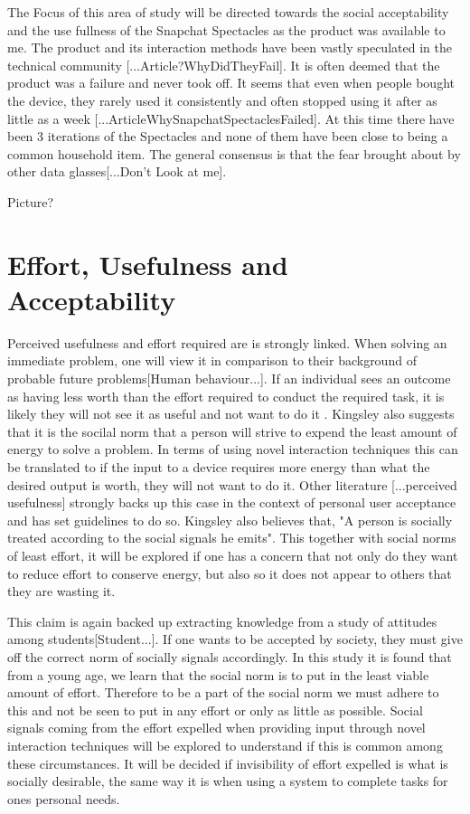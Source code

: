 \documentclass{l4proj}
\begin{document}
The Focus of this area of study will be directed towards the social acceptability and the use fullness of the Snapchat Spectacles as the product was available to me. The product and its interaction methods have been vastly speculated in the technical community [...Article?WhyDidTheyFail]. It is often deemed that the product was a failure and never took off. It seems that even when people bought the device, they rarely used it consistently and often stopped using it after as little as a week [...ArticleWhySnapchatSpectaclesFailed]. At this time there have been 3 iterations of the Spectacles and none of them have been close to being a common household item. The general consensus is that the fear brought about by other data glasses[...Don't Look at me].

Picture?


\section{Effort, Usefulness and Acceptability}

Perceived usefulness and effort required are is strongly linked. When solving an immediate problem, one will view it in comparison to their background of probable future problems[Human behaviour...].  If an individual sees an outcome as having less worth than the effort required to conduct the required task, it is likely they will not see it as useful and not want to do it . Kingsley also suggests that it is the socilal norm that a person will strive to expend the least amount of energy to solve a problem. In terms of using novel interaction techniques this can be translated to if the input to a device requires more energy than what the desired output is worth, they will not want to do it. Other literature [...perceived usefulness] strongly backs up this case in the context of personal user acceptance and has set guidelines to do so. Kingsley also believes that, "A person is socially treated according to the social signals he emits". This together with social norms of least effort, it will be explored if one has a concern that not only do they want to reduce effort to conserve energy, but also so it does not appear to others that they are wasting it. 

This claim is again backed up extracting knowledge from a study of attitudes among students[Student...]. If one wants to be accepted by society, they must give off the correct norm of socially signals accordingly. In this study it is found that from a young age, we learn that the social norm is to put in the least viable amount of effort. Therefore to be a part of the social norm we must adhere to this and not be seen to put in any effort or only as little as possible. Social signals coming from the effort expelled when providing input through novel interaction techniques will be explored to understand if this is common among these circumstances. It will be decided if invisibility of effort expelled is what is socially desirable, the same way it is when using a system to complete tasks for ones personal needs.
\end{document}
